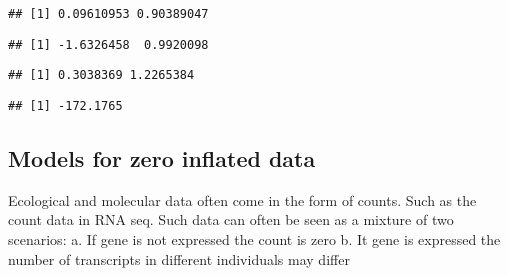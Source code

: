 \documentclass[]{article}
\newenvironment{Shaded}{\begin{snugshade}}{\end{snugshade}}
\newcommand{\NormalTok}[1]{#1}
\newcommand{\OperatorTok}[1]{\textcolor[rgb]{0.81,0.36,0.00}{\textbf{#1}}}
\begin{document}
\begin{Shaded}
\end{Shaded}

\begin{verbatim}
## [1] 0.09610953 0.90389047
\end{verbatim}

\begin{Shaded}
\end{Shaded}

\begin{verbatim}
## [1] -1.6326458  0.9920098
\end{verbatim}

\begin{Shaded}
\end{Shaded}

\begin{verbatim}
## [1] 0.3038369 1.2265384
\end{verbatim}

\begin{Shaded}
\end{Shaded}

\begin{verbatim}
## [1] -172.1765
\end{verbatim}

\hypertarget{models-for-zero-inflated-data}{%
\subsection{Models for zero inflated
data}\label{models-for-zero-inflated-data}}

Ecological and molecular data often come in the form of counts. Such as
the count data in RNA seq. Such data can often be seen as a mixture of
two scenarios: a. If gene is not expressed the count is zero b. It gene
is expressed the number of transcripts in different individuals may
differ
\end{document}
